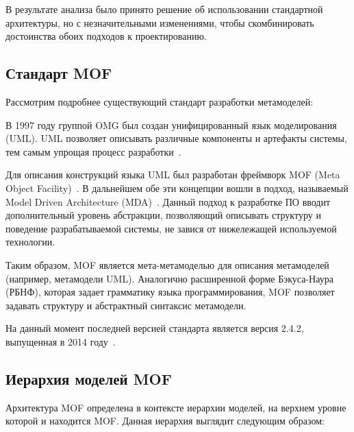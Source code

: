 В результате анализа было принято решение об использовании стандартной
архитектуры, но с незначительными изменениями, чтобы скомбинировать достоинства
обоих подходов к проектированию.

\subsection{Стандарт MOF}

Рассмотрим подробнее существующий стандарт разработки метамоделей:


В 1997 году группой OMG был создан унифицированный язык моделирования (UML).
UML позволяет описывать различные компоненты и артефакты системы, тем
самым упрощая процесс разработки~\cite{Fowler03}.

Для описания конструкций языка UML был разработан фреймворк MOF (Meta Object
Facility)~\cite{mof}. В дальнейшем обе эти концепции вошли в подход, называемый
Model Driven Architecture (MDA)~\cite{miller2003}. Данный подход к разработке ПО
вводит дополнительный уровень абстракции, позволяющий описывать структуру и
поведение разрабатываемой системы, не завися от нижележащей используемой
технологии.

Таким образом, MOF является мета-метамоделью для описания метамоделей (например,
метамодели UML). Аналогично расширенной форме Бэкуса-Наура (РБНФ), которая
задает грамматику языка программирования, MOF позволяет задавать структуру и
абстрактный синтаксис метамодели.

На данный момент последней версией стандарта является версия 2.4.2, выпущенная в
2014 году~\cite{mof}.

\subsection{Иерархия моделей MOF}

Архитектура MOF определена в контексте иерархии моделей, на верхнем уровне
которой и находится MOF. Данная иерархия выглядит следующим образом:

